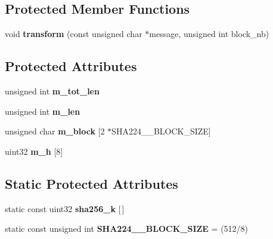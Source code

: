 \subsection*{Protected Member Functions}
\begin{DoxyCompactItemize}
\item 
\mbox{\label{classSHA256_a97f83033c1ff262737e763aa89be9487}} 
void {\bfseries transform} (const unsigned char $\ast$message, unsigned int block\+\_\+nb)
\end{DoxyCompactItemize}
\subsection*{Protected Attributes}
\begin{DoxyCompactItemize}
\item 
\mbox{\label{classSHA256_a322a3833dfe2b5b01f91e05fcab90177}} 
unsigned int {\bfseries m\+\_\+tot\+\_\+len}
\item 
\mbox{\label{classSHA256_aa692469ace938c44a2fda98432e051cb}} 
unsigned int {\bfseries m\+\_\+len}
\item 
\mbox{\label{classSHA256_aee6109fbc9d62b228e2c8f8203884660}} 
unsigned char {\bfseries m\+\_\+block} \mbox{[}2 $\ast$S\+H\+A224\+\_\+\_\+\+B\+L\+O\+C\+K\+\_\+\+S\+I\+ZE\mbox{]}
\item 
\mbox{\label{classSHA256_a515335b007cd905b9e8a5b9e080687bb}} 
uint32 {\bfseries m\+\_\+h} \mbox{[}8\mbox{]}
\end{DoxyCompactItemize}
\subsection*{Static Protected Attributes}
\begin{DoxyCompactItemize}
\item 
static const uint32 {\bfseries sha256\+\_\+k} \mbox{[}$\,$\mbox{]}
\item 
\mbox{\label{classSHA256_a2f94636534fc339f3210c12ec746bcb9}} 
static const unsigned int {\bfseries S\+H\+A224\+\_\+\_\+\+B\+L\+O\+C\+K\+\_\+\+S\+I\+ZE} = (512/8)
\end{DoxyCompactItemize}



